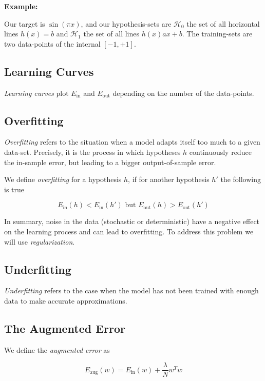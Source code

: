 \textbf{Example:}

Our target is \(\sin(\pi x)\), and our hypothesis-sets are \(\mathcal{H}_0\) the set of all horizontal 
lines \(h(x) = b\) and \(\mathcal{H}_1\) the set of all lines \(h(x) ax + b\). The training-sets are two data-points of the internal 
\([-1,+1]\).


\subsection{Learning Curves}

\emph{Learning curves} plot \(E_{\text{in}}\) and \(E_{\text{out}}\) depending on the number of the 
data-points.

\subsection{Overfitting}

\emph{Overfitting} refers to the situation when a model adapts itself too much to a given data-set. Precisely, it is the process 
in which hypotheses \(h\) continuously reduce the in-sample error, but leading to a bigger output-of-sample error.

We define \emph{overfitting} for a hypothesis \(h\), if for another hypothesis \(h'\) the following is true 

\[
    E_{\text{in}}(h) < E_{\text{in}}(h') \text{ but } E_{\text{out}}(h) > E_{\text{out}}(h')
\]

In summary, noise in the data (stochastic or deterministic) have a negative effect on the learning process and can lead 
to overfitting. To address this problem we will use \emph{regularization}.

\subsection{Underfitting}

\emph{Underfitting} refers to the case when the model has not been trained with enough data to make 
accurate approximations.

\subsection{The Augmented Error}

We define the \emph{augmented error} as 

\[
    E_{\text{aug}}(w) = E_{\text{in}}(w) + \frac{\lambda}{N}w^T w 
\]

